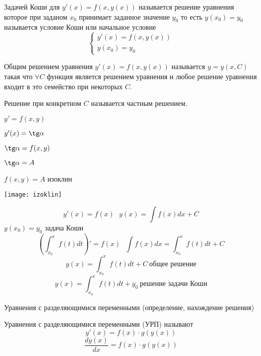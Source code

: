 \begin{define}
  Задачей Коши для $y'(x) = f(x, y(x))$ называется
  решение уравнения которое при заданом $x_0$ принимает
  заданное значение $y_0$ то есть $y(x_0) = y_0$
  называется условие Коши или начальное условие
  $$
  \left\{
  \begin{array}{l}
    y'(x) = f(x, y(x)) \\
    y(x_0) = y_0
  \end{array}
  \right.
  $$
\end{define}

\begin{define}
  Общим решением уравнения $y'(x) = f(x, y(x))$ называется $y = y(x,C)$
  такая что $\forall C$ функция является решением уравнения и любое
  решение уравнения входит в это семейство при некоторых $C$.

  Решение при конкретном $C$ называется частным решением.
\end{define}

\begin{define}[изоклина]
  $y' = f(x,y)$

  $y'(x) = \tg \alpha$

  $\tg \alpha = f(x,y)$

  $\tg \alpha = A$

  $f(x, y) = A$ изоклин

  \texttt{[image: izoklin]}
\end{define}

\begin{block}
  $$
  y'(x) = f(x) ~~~ y(x) = \int f(x)dx + C
  $$
  $y(x_0) = y_0$ задача Коши
  $$
  \left( \int_{x_0}^x f(t) dt \right)' = f(x) ~~~ \int f(x)dx = \int_{x_0}^x
  f(t)dt + C
  $$
  $$
  y(x) = \int_{x_0}^x f(t)dt + C ~ \text{общее решение}
  $$
  $$
  y(x) = \int_{x_0}^x f(t)dt + y_0 ~ \text{решение задачи Коши}
  $$
\end{block}

\begin{title}[\Large]
  Уравнения с разделяющимися переменными (определение, нахождение решения)
\end{title}

\begin{define}
  Уравнения с разделяющимися переменными (УРП) называют
  $$
  y'(x) = f(x) \cdot g(y(x))
  $$
  $$
  \frac{dy(x)}{dx} = f(x) \cdot g(y(x))
  $$
\end{define}

